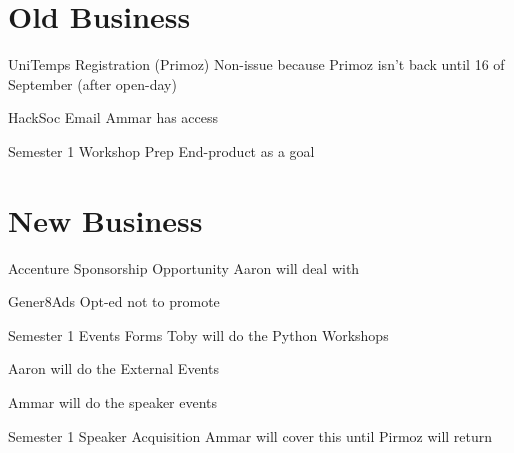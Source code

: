 \documentclass[11pt,hacksoc]{meetingmins}
\begin{document}
\maketitle

\section{Old Business}
\begin{items}
	\item
	UniTemps Registration (Primoz)
		\subitem
		Non-issue because Primoz isn't back until 16 of September (after open-day)
	
	\item
	HackSoc Email
		\subitem
		Ammar has access
	
	\item
	Semester 1 Workshop Prep
		\subitem
		End-product as a goal
		
\end{items}

\section{New Business}
\begin{items}
	\item
	Accenture Sponsorship Opportunity
		\subitem
		Aaron will deal with
	
	\item
	Gener8Ads
		\subitem
		Opt-ed not to promote
	
	\item
	Semester 1 Events Forms
		\subitem
		Toby will do the Python Workshops
		
		\subitem
		Aaron will do the External Events
		
		\subitem
		Ammar will do the speaker events
	
	\item
	Semester 1 Speaker Acquisition
		\subitem
		Ammar will cover this until Pirmoz will return
\end{items}

\vspace{1em}
\end{document}
